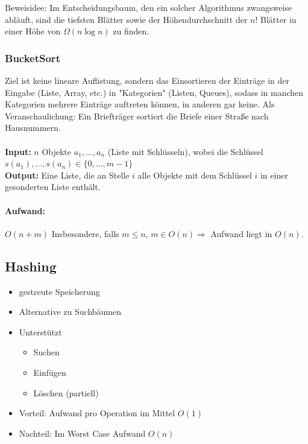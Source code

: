 \documentclass[fleqn]{scrartcl}
\begin{document}
Beweisidee: Im Entscheidungsbaum, den ein solcher Algorithmus zwangsweise abläuft, sind die tiefsten Blätter sowie der Höhendurchschnitt der $n!$ Blätter in einer Höhe von $\Omega (n \log n)$ zu finden.

\newpage
\subsubsection{BucketSort}
Ziel ist keine lineare Auflistung, sondern das Einsortieren der Einträge in der Eingabe (Liste, Array, etc.) in "Kategorien" (Listen, Queues), sodass in manchen Kategorien mehrere Einträge auftreten können, in anderen gar keine. Als Veranschaulichung: Ein Briefträger sortiert die Briefe einer Straße nach Hausnummern.\\\\
\textbf{Input:} $n$ Objekte $a_1, ..., a_n$ (Liste mit Schlüsseln), wobei die Schlüssel $s(a_1), ..., s(a_n) \in \{0, ..., m-1\}$\\
\textbf{Output:} Eine Liste, die an Stelle $i$ alle Objekte mit dem Schlüssel $i$ in einer gesonderten Liste enthält.
\paragraph{Aufwand:}
$O(n+m)$ Insbesondere, falls $m \leq n$, $m \in O(n) \Rightarrow$ Aufwand liegt in $O(n)$.

\subsection{Hashing}
\begin{itemize}
\item gestreute Speicherung
\item Alternative zu Suchbäumen
\item Unterstützt
\begin{itemize}
\item Suchen
\item Einfügen
\item Löschen (partiell)
\end{itemize}
\item Vorteil: Aufwand pro Operation im Mittel $O(1)$
\item Nachteil: Im Worst Case Aufwand $O(n)$
\end{itemize}
\end{document}

